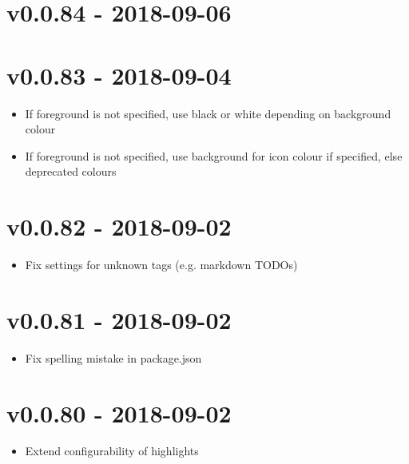 \chapter{v0.0.84 - 2018-09-06}

\chapter{v0.0.83 - 2018-09-04}
\begin{itemize}
\item{If foreground is not specified, use black or white depending on background colour}
\item{If foreground is not specified, use background for icon colour if specified, else deprecated colours}
\end{itemize}

\chapter{v0.0.82 - 2018-09-02}
\begin{itemize}
\item{Fix settings for unknown tags (e.g. markdown TODOs)}
\end{itemize}

\chapter{v0.0.81 - 2018-09-02}
\begin{itemize}
\item{Fix spelling mistake in package.json}
\end{itemize}

\chapter{v0.0.80 - 2018-09-02}
\begin{itemize}
\item{Extend configurability of highlights}
\end{itemize}

